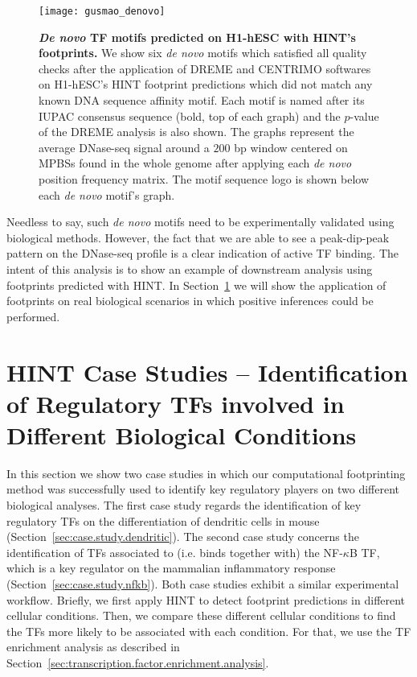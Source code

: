 \begin{figure}[h!]
\centering
\texttt{[image: gusmao\_denovo]}
\caption[\emph{De novo} TF motifs predicted on H1-hESC with HINT's footprints]{\textbf{\emph{De novo} TF motifs predicted on H1-hESC with HINT's footprints.} We show six \emph{de novo} motifs which satisfied all quality checks after the application of DREME and CENTRIMO softwares on H1-hESC's HINT footprint predictions which did not match any known DNA sequence affinity motif. Each motif is named after its IUPAC consensus sequence (bold, top of each graph) and the $p$-value of the DREME analysis is also shown. The graphs represent the average DNase-seq signal around a $200$ bp window centered on MPBSs found in the whole genome after applying each \emph{de novo} position frequency matrix. The motif sequence logo is shown below each \emph{de novo} motif's graph.}
\label{fig:gusmao_denovo}
\end{figure}

Needless to say, such \emph{de novo} motifs need to be experimentally validated using biological methods. However, the fact that we are able to see a peak-dip-peak pattern on the DNase-seq profile is a clear indication of active TF binding. The intent of this analysis is to show an example of downstream analysis using footprints predicted with HINT. In Section~\ref{sec:case.studies} we will show the application of footprints on real biological scenarios in which positive inferences could be performed.

\section{HINT Case Studies -- Identification of Regulatory TFs involved in Different Biological Conditions}
\label{sec:case.studies}

In this section we show two case studies in which our computational footprinting method was successfully used to identify key regulatory players on two different biological analyses. The first case study regards the identification of key regulatory TFs on the differentiation of dendritic cells in mouse (Section~\ref{sec:case.study.dendritic}). The second case study concerns the identification of TFs associated to (i.e. binds together with) the NF-$\kappa$B TF, which is a key regulator on the mammalian inflammatory response (Section~\ref{sec:case.study.nfkb}). Both case studies exhibit a similar experimental workflow. Briefly, we first apply HINT to detect footprint predictions in different cellular conditions. Then, we compare these different cellular conditions to find the TFs more likely to be associated with each condition. For that, we use the TF enrichment analysis as described in Section~\ref{sec:transcription.factor.enrichment.analysis}.

